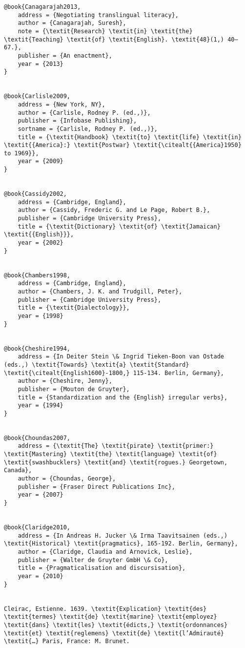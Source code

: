 \begin{verbatim}
@book{Canagarajah2013,
	address = {Negotiating translingual literacy},
	author = {Canagarajah, Suresh},
	note = {\textit{Research} \textit{in} \textit{the} \textit{Teaching} \textit{of} \textit{English}. \textit{48}(1,) 40–67.},
	publisher = {An enactment},
	year = {2013}
}


@book{Carlisle2009,
	address = {New York, NY},
	author = {Carlisle, Rodney P. (ed.,)},
	publisher = {Infobase Publishing},
	sortname = {Carlisle, Rodney P. (ed.,)},
	title = {\textit{Handbook} \textit{to} \textit{life} \textit{in} \textit{{America}:} \textit{Postwar} \textit{\citealt{{America}1950} to 1969}},
	year = {2009}
}


@book{Cassidy2002,
	address = {Cambridge, England},
	author = {Cassidy, Frederic G. and Le Page, Robert B.},
	publisher = {Cambridge University Press},
	title = {\textit{Dictionary} \textit{of} \textit{Jamaican} \textit{{English}}},
	year = {2002}
}


@book{Chambers1998,
	address = {Cambridge, England},
	author = {Chambers, J. K. and Trudgill, Peter},
	publisher = {Cambridge University Press},
	title = {\textit{Dialectology}},
	year = {1998}
}


@book{Cheshire1994,
	address = {In Deiter Stein \& Ingrid Tieken-Boon van Ostade (eds.,) \textit{Towards} \textit{a} \textit{Standard} \textit{\citealt{English1600}-1800,} 115-134. Berlin, Germany},
	author = {Cheshire, Jenny},
	publisher = {Mouton de Gruyter},
	title = {Standardization and the {English} irregular verbs},
	year = {1994}
}


@book{Choundas2007,
	address = {\textit{The} \textit{pirate} \textit{primer:} \textit{Mastering} \textit{the} \textit{language} \textit{of} \textit{swashbucklers} \textit{and} \textit{rogues.} Georgetown, Canada},
	author = {Choundas, George},
	publisher = {Fraser Direct Publications Inc},
	year = {2007}
}


@book{Claridge2010,
	address = {In Andreas H. Jucker \& Irma Taavitsainen (eds.,) \textit{Historical} \textit{pragmatics}, 165-192. Berlin, Germany},
	author = {Claridge, Claudia and Arnovick, Leslie},
	publisher = {Walter de Gruyter GmbH \& Co},
	title = {Pragmaticalisation and discursisation},
	year = {2010}
}


Cleirac, Estienne. 1639. \textit{Explication} \textit{des} \textit{termes} \textit{de} \textit{marine} \textit{employez} \textit{dans} \textit{les} \textit{édicts,} \textit{ordonnances} \textit{et} \textit{reglemens} \textit{de} \textit{l’Admirauté} \textit{…} Paris, France: M. Brunet.


\end{verbatim}
